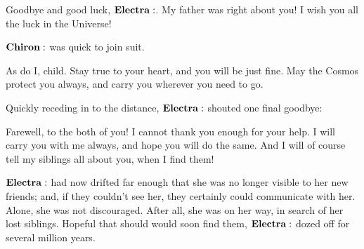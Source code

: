 \Hippe Goodbye and good luck, $\Electra$.  My father was right about you!  I wish you all the luck in the Universe!

$\Chiron$ was quick to join suit.

\Chiron As do I, child.  Stay true to your heart, and you will be just fine.  May the Cosmos protect you always, and carry you wherever you need to go.

Quickly receding in to the distance, $\Electra$ shouted one final goodbye:

\Electra Farewell, to the both of you!  I cannot thank you enough for your help.  I will carry you with me always, and hope you will do the same.  And I will of course tell my siblings all about you, when I find them!

$\Electra$ had now drifted far enough that she was no longer visible to her new friends; and, if they couldn't see her, they certainly could communicate with her.  Alone, she was not discouraged.  After all, she was on her way, in search of her lost siblings.  Hopeful that should would soon find them, $\Electra$ dozed off for several million years.


